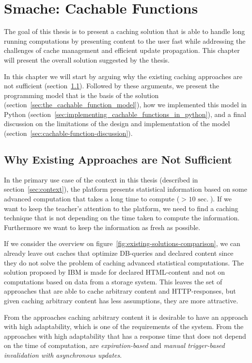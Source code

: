 \chapter{Smache: Cachable Functions}
\label{chapter:smache-cachable-functions}

The goal of this thesis is to present a caching solution that is able to handle long running computations by presenting content to the user fast while addressing the challenges of cache management and efficient update propagation. This chapter will present the overall solution suggested by the thesis.

In this chapter we will start by arguing why the existing caching approaches are not sufficient (section~\ref{sec:existing-approaches-are-not-sufficient}). Followed by these arguments, we present the programming model that is the basis of the solution (section~\ref{sec:the_cachable_function_model}), how we implemented this model in Python (section~\ref{sec:implementing_cachable_functions_in_python}), and a final discussion on the limitations of the design and implementation of the model (section~\ref{sec:cachable-function-discussion}).

\section{Why Existing Approaches are Not Sufficient}
\label{sec:existing-approaches-are-not-sufficient}

In the primary use case of the context in this thesis (described in section~\ref{sec:context}), the platform presents statistical information based on some advanced computation that takes a long time to compute ($>\text{ 10 sec.}$). If we want to keep the teacher's attention to the platform, we need to find a caching technique that is not depending on the time taken to compute the information. Furthermore we want to keep the information as fresh as possible.

If we consider the overview on figure~\ref{fig:existing-solutions-comparison}, we can already leave out caches that optimize DB-queries and declared content since they do not solve the problem of caching advanced statistical computations. The solution proposed by IBM is made for declared HTML-content and not on computations based on data from a storage system. This leaves the set of approaches that are able to cache arbitrary content and HTTP-responses, but given caching arbitrary content has less assumptions, they are more attractive.

From the approaches caching arbitrary content it is desirable to have an approach with high adaptability, which is one of the requirements of the system. From the approaches with high adaptability that has a response time that does not depend on the time of computation, are \emph{expiration-based} and \emph{manual trigger-based invalidation with asynchronous updates}.


